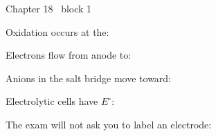 \documentclass{apchem-worksheet}
\begin{document}
\begin{spiralstrip}{Chapter 18 \textbullet\ block 1}
  \item Oxidation occurs at the: 
  \item Electrons flow from anode to: 
  \item Anions in the salt bridge move toward:
  \item Electrolytic cells have $E^\circ$: 
  \item The exam will not ask you to label an electrode:
\end{spiralstrip}
\end{document}
